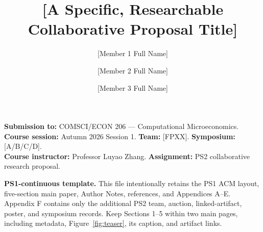 \documentclass[sigconf,nonacm]{acmart}
\title{[A Specific, Researchable Collaborative Proposal Title]}
\author{[Member 1 Full Name]}
\affiliation{\institution{Duke Kunshan University}\city{Kunshan}\country{China}}
\author{[Member 2 Full Name]}
\affiliation{\institution{Duke Kunshan University}\city{Kunshan}\country{China}}
\author{[Member 3 Full Name]}
\affiliation{\institution{Duke Kunshan University}\city{Kunshan}\country{China}}
\newcommand{\CourseNumber}{COMSCI/ECON 206}
\newcommand{\CourseName}{Computational Microeconomics}
\newcommand{\CourseSession}{Autumn 2026 Session 1}
\newcommand{\Instructor}{Professor Luyao Zhang}
\newcommand{\TeamCode}{[FPXX]}
\newcommand{\SymposiumSession}{[A/B/C/D]}
\newcommand{\coursemeta}{\noindent\textbf{Submission to:} \CourseNumber{} --- \CourseName.\\
\textbf{Course session:} \CourseSession. \textbf{Team:} \TeamCode. \textbf{Symposium:} \SymposiumSession.\\
\textbf{Course instructor:} \Instructor. \textbf{Assignment:} PS2 collaborative research proposal.\par\smallskip}
\begin{document}
\begin{teaserfigure}
\captionsetup{skip=8pt}
\centering

\caption{One integrated PS2 evidence chain. Economic reasoning defines the strategic question and institutional objective; reproducible computation tests the model; behavioral evidence probes assumptions; the A0 poster communicates the combined claim and its practical implications for a concrete real-world case. Replace every placeholder and distinguish completed evidence from planned work.}
\label{fig:teaser}
\end{teaserfigure}
\maketitle\raggedbottom\coursemeta

\noindent\textcolor{CourseTeal}{\textbf{PS1-continuous template.}} This file intentionally retains the PS1 ACM layout, five-section main paper, Author Notes, references, and Appendices A--E. Appendix F contains only the additional PS2 team, auction, linked-artifact, poster, and symposium records. Keep Sections 1--5 within two main pages, including metadata, Figure~\ref{fig:teaser}, its caption, and artifact links.



\end{document}
